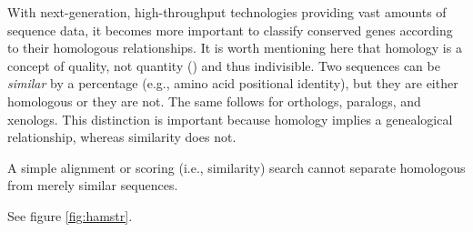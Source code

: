 With next-generation, high-throughput technologies providing vast amounts of
sequence data, it becomes more important to classify conserved genes according
to their homologous relationships. It is worth mentioning here that homology is
a concept of quality, not quantity (\cite{reeck1987}) and thus indivisible. Two
sequences can be \emph{similar} by a percentage (e.g., amino acid positional
identity), but they are either homologous or they are not. The same follows for
orthologs, paralogs, and xenologs. This distinction is important because
homology implies a genealogical relationship, whereas similarity does not.

A simple alignment or scoring (i.e., similarity) search cannot separate
homologous from merely similar sequences.

See figure \ref{fig:hamstr}.
